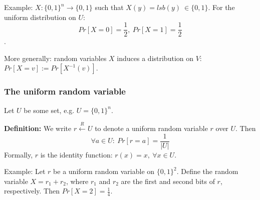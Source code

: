 \documentclass[12pt]{book}
\newcommand{\Def}{\textcolor{dkgreen}{\textbf{Definition:}} }
\begin{document}
Example: $X:\{0,1\}^{n}\rightarrow\{0,1\}$ such that $X(y)=lsb(y)\ \in\{0,1\} $. For the uniform distribution on $U$: $$Pr[X=0]=\frac{1}{2},\ Pr[X=1]=\frac{1}{2}$$.

More generally: random variables $X$ induces a distribution on $V$: $Pr[X=v]:=Pr[X^{-1}(v)]$.

\subsubsection{The uniform random variable}
Let $U$ be some set, e.g. $U=\{0,1\}^{n}$.

\Def We write $r\xleftarrow{R} U$ to denote a uniform random variable $r$ over $U$. Then $$\forall a\in U:\ Pr[r=a]=\frac{1}{|U|}$$
Formally, $r$ is the identity function: $r(x)=x,\ \forall x\in U$.

Example: Let $r$ be a uniform random variable on $\{0,1\}^{2}$. Define the random variable $X=r_{1}+r_{2}$, where $r_{1}$ and $r_{2}$ are the first and second bits of $r$, respectively. Then $Pr[X=2]=\frac{1}{4}$.
\end{document}
